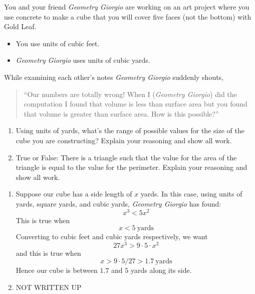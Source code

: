 \documentclass[handout,nooutcomes,noauthor]{ximera}
\begin{document}
\begin{question}
  You and your friend \textit{Geometry Giorgio} are working on an art
  project where you use concrete to make a cube that you will cover
  five faces (not the bottom) with Gold Leaf.
  \begin{itemize}
  \item You use units of cubic feet.
  \item \textit{Geometry Giorgio} uses units of cubic yards.
  \end{itemize}
  While examining each other's notes \textit{Geometry Giorgio}
  suddenly shouts,
  \begin{quote}
    ``Our numbers are totally wrong! When I (\textit{Geometry Giorgio})
    did the computation I found that volume is less than surface area
    but you found that volume is greater than surface area.  How is
    this possible?''
  \end{quote}
  \begin{enumerate}
  \item Using units of yards, what's the range of possible values
    for the size of the cube you are constructing? Explain your
    reasoning and show all work.
  \item True or False: There is a triangle such that the value for the
    area of the triangle is equal to the value for the
    perimeter. Explain your reasoning and show all work.
  \end{enumerate}
  \begin{freeResponse}
    \begin{enumerate}
    \item Suppose our cube has a side length of $x$ yards. In this
      case, using units of yards, square yards, and cubic yards,
      \textit{Geometry Giorgio} has found:
      \[
      x^3 < 5x^2
      \]
      This is true when
      \[
      x<5~\text{yards}
      \]
      Converting to cubic feet and cubic yards respectively, we want
      \[
      27x^3 > 9\cdot 5\cdot x^2
      \]
      and this is true when
      \[
      x > 9\cdot 5/27 > 1.7~\text{yards}
      \]
      Hence our cube is between $1.7$ and $5$ yards along its side.
    \item NOT WRITTEN UP
    \end{enumerate}
  \end{freeResponse}
\end{question}
\end{document}
